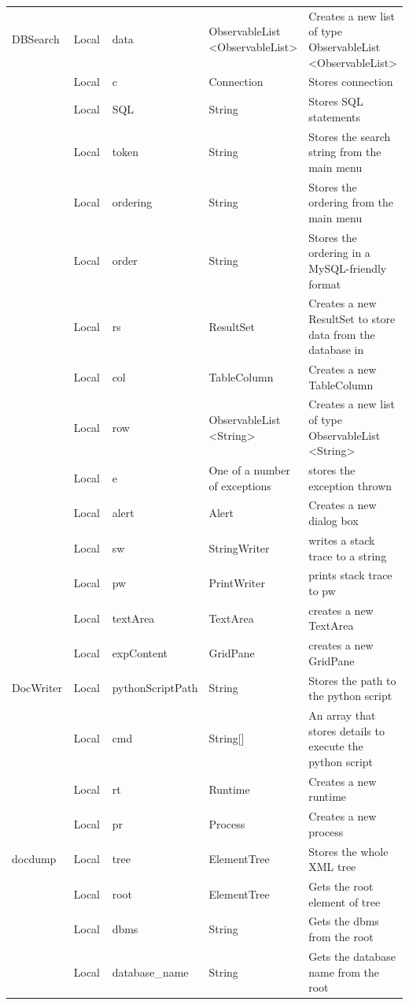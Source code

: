 \documentclass[11pt]{report}
\begin{document}
\begin{longtable}{|p{0.2\linewidth}|p{0.2\linewidth}|p{0.2\linewidth}|p{0.2\linewidth}|p{0.2\linewidth}|}
			 \hline
			DBSearch & Local & data & ObservableList <ObservableList> & Creates a new list of type ObservableList <ObservableList> \\
			 & Local & c & Connection & Stores connection\\
			 & Local & SQL & String & Stores SQL statements \\
			 & Local & token & String & Stores the search string from the main menu \\
			 & Local & ordering & String & Stores the ordering from the main menu \\
			 & Local & order & String & Stores the ordering in a MySQL-friendly format \\
			 & Local & rs & ResultSet & Creates a new ResultSet to store data from the database in \\
			 & Local & col & TableColumn & Creates a new TableColumn \\
			 & Local & row  & ObservableList <String> & Creates a new list of type ObservableList <String> \\
			 & Local & e & One of a number of exceptions & stores the exception thrown \\
			 & Local & alert & Alert & Creates a new dialog box\\
			 & Local & sw & StringWriter & writes a stack trace to a string \\
			 & Local & pw & PrintWriter & prints stack trace to pw \\
			 & Local & textArea & TextArea & creates a new TextArea \\
			 & Local & expContent & GridPane & creates a new GridPane\\ 
			\hline
			DocWriter & Local & pythonScriptPath & String & Stores the path to the python script \\
			 & Local & cmd & String[] & An array that stores details to execute the python script \\
			 & Local & rt & Runtime & Creates a new runtime \\
			 & Local & pr & Process & Creates a new process \\
			 \hline
			docdump & Local & tree & ElementTree & Stores the whole XML tree \\
			 & Local & root & ElementTree & Gets the root element of tree \\
			 & Local & dbms & String & Gets the dbms from the root \\
			 & Local & database\_name & String & Gets the database name from the root \\

\end{longtable}
\end{document}
